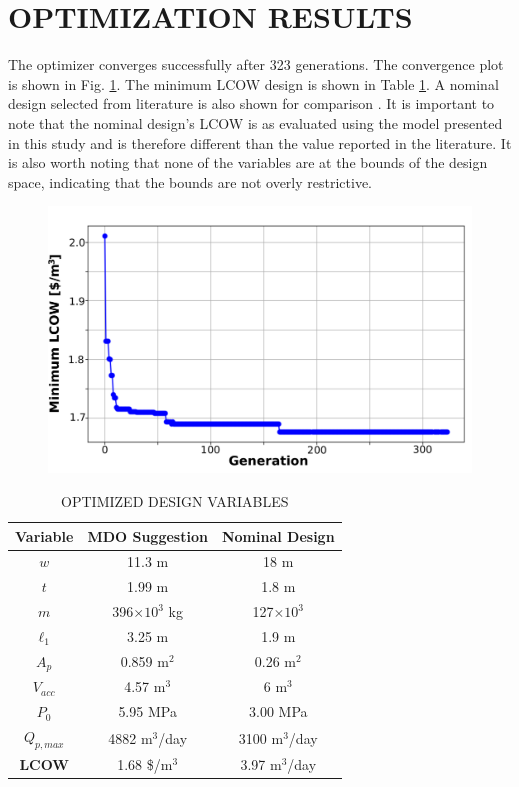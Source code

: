 \documentclass[twocolumn,10pt]{asme2e}
\begin{document}
\section{OPTIMIZATION RESULTS}
The optimizer converges successfully after 323 generations. The convergence plot is shown in Fig. \ref{fig:convergence}. The minimum LCOW design is shown in Table \ref{tab:opt}. A nominal design selected from literature is also shown for comparison \cite{YJecon2017}. It is important to note that the nominal design's LCOW is as evaluated using the model presented in this study and is therefore different than the value reported in the literature. It is also worth noting that none of the variables are at the bounds of the design space, indicating that the bounds are not overly restrictive.

\begin{figure}[h]
    \centering
    \includegraphics[width=\linewidth]{../figs/optimization_progress.pdf}
    \label{fig:convergence}
\end{figure}

\begin{table}[h]
    \centering
    \caption{OPTIMIZED DESIGN VARIABLES}
    \begin{tabular}{ccc}
        \hline
        \textbf{Variable} & \textbf{MDO Suggestion} & \textbf{Nominal Design} \cite{YJecon2017}\\
        \hline
        $w$ & 11.3 m & 18 m \\
        $t$ & 1.99 m & 1.8 m \\
        $m$ & 396$\times10^3$ kg & 127$\times10^3$ \\
        $\ell_1$ & 3.25 m & 1.9 m \\
        $A_p$ & 0.859 m$^2$ & 0.26 m$^2$ \\
        $V_{acc}$ & 4.57 m$^3$ & 6 m$^3$ \\
        $P_0$ & 5.95 MPa & 3.00 MPa \\
        $Q_{p,max}$ & 4882 m$^3$/day & 3100 m$^3$/day \\
        \hline
        \textbf{LCOW} & 1.68 \$/m$^3$ & 3.97 m$^3$/day \\
        \hline
    \end{tabular}
    \label{tab:opt}
\end{table}
\end{document}
